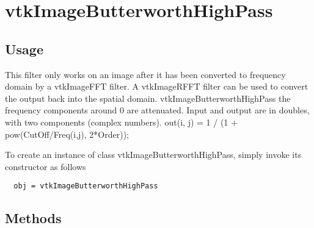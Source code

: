 \section{vtkImageButterworthHighPass}

\subsection{Usage}

 This filter only works on an image after it has been converted to
 frequency domain by a vtkImageFFT filter.  A vtkImageRFFT filter
 can be used to convert the output back into the spatial domain.
 vtkImageButterworthHighPass  the frequency components around 0 are
 attenuated.  Input and output are in doubles, with two components
 (complex numbers).
 out(i, j) = 1 / (1 + pow(CutOff/Freq(i,j), 2*Order));

To create an instance of class vtkImageButterworthHighPass, simply
invoke its constructor as follows
\begin{verbatim}
  obj = vtkImageButterworthHighPass
\end{verbatim}
\subsection{Methods}

